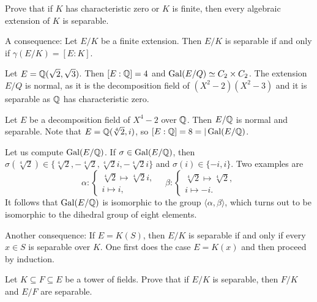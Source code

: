 \begin{exercise}
Prove that if $K$ has characteristic zero or $K$ is finite, then 
every algebraic extension of $K$ is separable. 
\end{exercise}

A consequence: 
Let $E/K$ be a finite extension. Then $E/K$ is separable
if and only if $\gamma(E/K)=[E:K]$. 

\begin{example}
    Let $E=\mathbb{Q}(\sqrt{2},\sqrt{3})$. Then 
    $[E:\mathbb{Q}]=4$ and 
    $\operatorname{Gal}(E/Q)\simeq C_2\times C_2$. The extension $E/Q$ is normal, 
    as it is the decomposition field of $(X^2-2)(X^2-3)$ and 
    it is separable as $\mathbb{Q}$ has characteristic zero. 
\end{example}

\begin{example}
    Let $E$ be a decomposition field of $X^4-2$ over $\mathbb{Q}$. 
    Then $E/\mathbb{Q}$ is normal and separable. Note that
    $E=\mathbb{Q}(\sqrt[4]{2},i)$, so $[E:\mathbb{Q}]=8=|\operatorname{Gal}(E/\mathbb{Q})$. 
    
    Let us compute
    $\operatorname{Gal}(E/\mathbb{Q})$. If $\sigma\in\operatorname{Gal}(E/\mathbb{Q})$, then 
    $\sigma(\sqrt[4]{2})\in\{\sqrt[4]{2},-\sqrt[4]{2},\sqrt[4]{2}i,-\sqrt[4]{2}i\}$ and 
    $\sigma(i)\in\{-i,i\}$. Two examples are 
    \[
    \alpha\colon\begin{cases}
    \sqrt[4]{2}\mapsto\sqrt[4]{2}i,\\
    i\mapsto i,
    \end{cases}
    \quad
    \beta\colon\begin{cases}
    \sqrt[4]{2}\mapsto\sqrt[4]{2},\\
    i\mapsto -i.
    \end{cases}
    \]
    It follows that 
    $\operatorname{Gal}(E/\mathbb{Q})$ is isomorphic to the group $\langle\alpha,\beta\rangle$, which turns out to be
    isomorphic to the dihedral group
    of eight elements. 
\end{example}

Another consequence: If $E=K(S)$, then $E/K$ is separable if and only if
every $x\in S$ is separable over $K$. One first does the case $E=K(x)$ 
and then proceed by induction. 

\begin{exercise}
\label{xca:separable1}
    Let $K\subseteq F\subseteq E$ be a tower of fields. Prove that 
    if $E/K$ is separable, then $F/K$ and $E/F$ are separable. 
\end{exercise}

